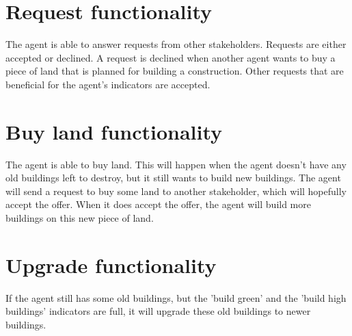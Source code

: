 \section{Request functionality}
The agent is able to answer requests from other stakeholders. Requests are either accepted or declined. A request is declined when another agent wants to buy a piece of land that is planned for building a construction. Other requests that are beneficial for the agent’s indicators are accepted.

\section{Buy land functionality}
The agent is able to buy land. This will happen when the agent doesn't have any old buildings left to destroy, but it still wants to build new buildings. The agent will send a request to buy some land to another stakeholder, which will hopefully accept the offer. When it does accept the offer, the agent will build more buildings on this new piece of land.

\section{Upgrade functionality}
If the agent still has some old buildings, but the 'build green' and the 'build high buildings' indicators are full, it will upgrade these old buildings to newer buildings.

